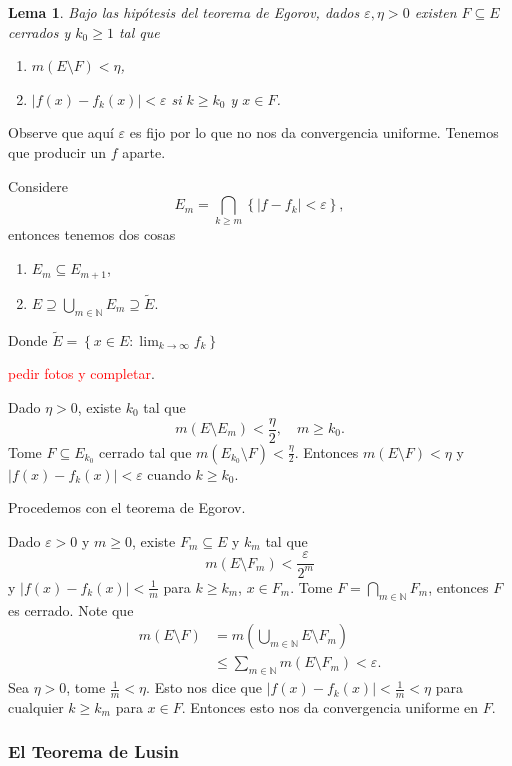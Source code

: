 \documentclass[12pt]{article}
\theoremstyle{plain}
\newtheorem{Lem}[Th]{Lema}             %
\theoremstyle{definition}
\theoremstyle{remark}
\numberwithin{equation}{section}
\newcommand{\bN}{\mathbb{N}}        %
\renewcommand{\geq}{\geqslant}      %
\renewcommand{\leq}{\leqslant}      %
\renewcommand{\:}{\colon}           %
\newcommand{\conj}[1]{\left\lbrace#1\right\rbrace}
\begin{document}
\begin{multicols}{2}
\begin{Lem}
  Bajo las hipótesis del teorema de Egorov, dados $\varepsilon,\eta>0$ existen $F\subseteq E$ cerrados y $k_0\geq 1$ tal que
  \begin{enumerate}
    \item $m(E\setminus F)<\eta$,
    \item $|f(x)-f_k(x)|<\varepsilon$ si $k\geq k_0$ y $x\in F$.
  \end{enumerate}
\end{Lem}
Observe que aquí $\varepsilon$ es fijo por lo que no nos da convergencia uniforme. Tenemos que producir un $f$ aparte.
\begin{ptcbp}
Considere
$$E_m=\bigcap_{k\geq m}\conj{|f-f_k|<\varepsilon},$$
entonces tenemos dos cosas
\begin{enumerate}
  \item $E_m\subseteq E_{m+1}$,
  \item $E\supseteq\bigcup_{m\in\bN}E_m\supseteq\tilde{E}$.
\end{enumerate}
Donde $\tilde{E}=\conj{x\in E\: \lim_{k\to\infty}f_k}$ \par
\textcolor{red}{pedir fotos y completar}.\par
Dado $\eta>0$, existe $k_0$ tal que
$$m(E\setminus E_m)<\frac{\eta}{2},\quad m\geq k_0. $$
Tome $F\subseteq E_{k_0}$ cerrado tal que $m(E_{k_0}\setminus F)<\frac{\eta}{2}$. Entonces $m(E\setminus F)<\eta$ y $|f(x)-f_k(x)|<\varepsilon$ cuando $k\geq k_0$.
\end{ptcbp}

Procedemos con el teorema de Egorov.

\begin{ptcbp}
Dado $\varepsilon>0$ y $m\geq 0$, existe $F_m\subseteq E$ y $k_m$ tal que
$$m(E\setminus F_m)<\frac{\varepsilon}{2^m}$$
y $|f(x)-f_k(x)|<\frac{1}{m}$ para $k\geq k_m$, $x\in F_m$. Tome $F=\bigcap_{m\in\bN}F_m$, entonces $F$ es cerrado. Note que
\begin{align*}
  m(E\setminus F) &=m\left(\bigcup_{m\in\bN} E\setminus F_m\right)\\
  &\leq \sum_{m\in\bN}m(E\setminus F_m)<\varepsilon.
\end{align*}
Sea $\eta>0$, tome $\frac{1}{m}<\eta$. Esto nos dice que $|f(x)-f_k(x)|<\frac{1}{m}<\eta$ para cualquier $k\geq k_m$ para $x\in F$. Entonces esto nos da convergencia uniforme en $F$.
\end{ptcbp}

\subsubsection*{El Teorema de Lusin}


\end{multicols}
\end{document}
